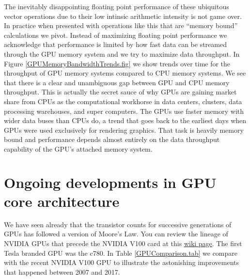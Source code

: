 The inevitably disappointing floating point performance of these ubiquitous vector operations due to their low intinsic arithmetic intensity is not game over. In practice when presented with operations like this that are ``memory bound'' calculations we pivot. Instead of maximizing floating point performance we acknowledge that performance is limited by how fast data can be streamed through the GPU memory system and we try to maximize data throughput. In Figure \ref{GPUMemoryBandwidthTrends.fig} we show trends over time for the throughput of GPU memory systems compared to CPU memory systems. We see that there is a clear and unambiguous gap between GPU and CPU memory throughput. This is actually the secret sauce of why GPUs are gaining market share from CPUs as the computational workhorse in data centers, clusters, data processing warehouses, and super computers. The GPUs use faster memory with wider data buses than CPUs do, a trend that goes back to the earliest days when GPUs were used exclusively for rendering graphics. That task is heavily memory bound and performance depends almost entirely on the data throughput capability of the GPU's attached memory system.  


\section{Ongoing developments in GPU core architecture}


We have seen already that the transistor counts for successive generations of GPUs has followed a version of Moore's Law. You can review the lineage of NVIDIA GPUs that precede the NVIDIA V100 card at this \href{https://en.wikipedia.org/wiki/Nvidia_Tesla}{wiki page}. The first Tesla branded GPU was the c780. In Table \ref{GPUComparison.tab} we compare with the recent NVIDIA V100 GPU to illustrate the astonishing improvements that happened between 2007 and 2017.

